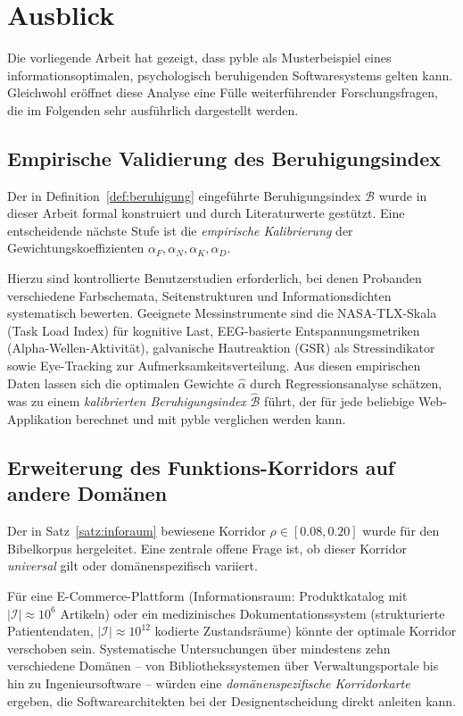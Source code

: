 ﻿\documentclass[a4paper,12pt]{article}
\theoremstyle{definition}
\begin{document}
\section{Ausblick}
\label{sec:ausblick}

Die vorliegende Arbeit hat gezeigt, dass pyble als Musterbeispiel eines
informationsoptimalen, psychologisch beruhigenden Softwaresystems gelten kann.
Gleichwohl eröffnet diese Analyse eine Fülle weiterführender Forschungsfragen,
die im Folgenden sehr ausführlich dargestellt werden.

\subsection{Empirische Validierung des Beruhigungsindex}

Der in Definition~\ref{def:beruhigung} eingeführte Beruhigungsindex $\mathcal{B}$
wurde in dieser Arbeit formal konstruiert und durch Literaturwerte gestützt.
Eine entscheidende nächste Stufe ist die \emph{empirische Kalibrierung} der
Gewichtungskoeffizienten $\alpha_F, \alpha_N, \alpha_K, \alpha_D$.

Hierzu sind kontrollierte Benutzerstudien erforderlich, bei denen Probanden
verschiedene Farbschemata, Seitenstrukturen und Informationsdichten systematisch
bewerten. Geeignete Messinstrumente sind die NASA-TLX-Skala (Task Load Index)
für kognitive Last, EEG-basierte Entspannungsmetriken (Alpha-Wellen-Aktivität),
galvanische Hautreaktion (GSR) als Stressindikator sowie Eye-Tracking zur
Aufmerksamkeitsverteilung. Aus diesen empirischen Daten lassen sich die optimalen
Gewichte $\hat{\alpha}$ durch Regressionsanalyse schätzen, was zu einem
\emph{kalibrierten Beruhigungsindex} $\hat{\mathcal{B}}$ führt, der für jede
beliebige Web-Applikation berechnet und mit pyble verglichen werden kann.

\subsection{Erweiterung des Funktions-Korridors auf andere Domänen}

Der in Satz~\ref{satz:inforaum} bewiesene Korridor $\rho \in [0.08, 0.20]$
wurde für den Bibelkorpus hergeleitet. Eine zentrale offene Frage ist,
ob dieser Korridor \emph{universal} gilt oder domänenspezifisch variiert.

Für eine E-Commerce-Plattform (Informationsraum: Produktkatalog mit
$|\mathcal{I}| \approx 10^6$ Artikeln) oder ein medizinisches
Dokumentationssystem (strukturierte Patientendaten, $|\mathcal{I}| \approx 10^{12}$
kodierte Zustandsräume) könnte der optimale Korridor verschoben sein.
Systematische Untersuchungen über mindestens zehn verschiedene Domänen
-- von Bibliothekssystemen über Verwaltungsportale bis hin zu
Ingenieursoftware -- würden eine \emph{domänenspezifische Korridorkarte}
ergeben, die Softwarearchitekten bei der Designentscheidung direkt
anleiten kann.
\end{document}
